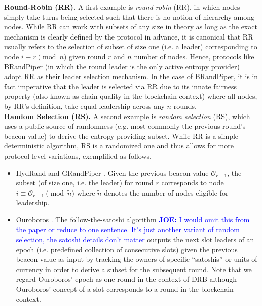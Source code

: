 \documentclass[letterpaper,twocolumn,10pt]{article}
\theoremstyle{definition}
\theoremstyle{remark}
\newcommand{\joenote}[1]{\textcolor{blue}{\textbf{JOE:} #1}}
\begin{document}
\noindent\textbf{Round-Robin (RR).} A first example is \textit{round-robin} (RR), in which nodes simply take turns being selected such that there is no notion of hierarchy among nodes. While RR can work with subsets of any size in theory as long as the exact mechanism is clearly defined by the protocol in advance, it is canonical that RR usually refers to the selection of subset of size one (i.e. a leader) corresponding to node $i \equiv r \pmod n$ given round $r$ and $n$ number of nodes. Hence, protocols like BRandPiper \cite{bhat2020randpiper} (in which the round leader is the only active entropy provider) adopt RR as their leader selection mechanism. In the case of BRandPiper, it is in fact imperative that the leader is selected via RR due to its innate fairness property \cite{azouvi2018winning} (also known as chain quality \cite{garay2015bitcoin} in the blockchain context) where all nodes, by RR's definition, take equal leadership across any $n$ rounds.\\

\noindent\textbf{Random Selection (RS).} A second example is \textit{random selection} (RS), which uses a public source of randomness (e.g. most commonly the previous round's beacon value) to derive the entropy-providing subset. While RR is a simple deterministic algorithm, RS is a randomized one and thus allows for more protocol-level variations, exemplified as follows.
\begin{itemize}
\item HydRand \cite{schindler2020hydrand} and GRandPiper \cite{bhat2020randpiper}. Given the previous beacon value $\mathcal{O}_{r - 1}$, the subset (of size one, i.e. the leader) for round $r$ corresponds to node $i \equiv \mathcal{O}_{r - 1} \pmod{\tilde{n}}$ where $\tilde{n}$ denotes the number of nodes eligible for leadership.
\item Ouroboros \cite{kiayias2017ouroboros}. The follow-the-satoshi algorithm \cite{bentov2014proof,kiayias2017ouroboros}\joenote{I would omit this from the paper or reduce to one sentence. It's just another variant of random selection, the satoshi details don't matter} outputs the next slot leaders of an epoch (i.e. predefined collection of consecutive slots) given the previous beacon value as input by tracking the owners of specific ``satoshis'' or units of currency in order to derive a subset for the subsequent round. Note that we regard Ouroboros' epoch as one round in the context of DRB although Ouroboros' concept of a slot corresponds to a round in the blockchain context.
\end{itemize}
\end{document}
